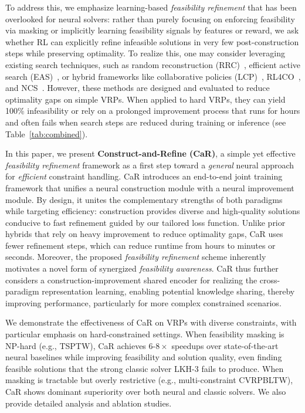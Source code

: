 \documentclass{article} %
\begin{document}
To address this, we emphasize learning-based \emph{feasibility refinement} that has been overlooked for neural solvers: rather than purely focusing on enforcing feasibility via masking or implicitly learning feasibility signals by features or reward, we ask whether RL can explicitly refine infeasible solutions in very few post-construction steps while preserving optimality. To realize this, one may consider leveraging existing search techniques, such as random reconstruction (RRC)~\citep{luo2023neural}, efficient active search (EAS)~\citep{hottung2022efficient}, or hybrid frameworks like collaborative policies (LCP)~\citep{Kim2021LearningCP}, RL4CO~\citep{berto2025rl4co}, and NCS~\citep{kong2024efficient}. However, these methods are designed and evaluated to reduce optimality gaps on simple VRPs. When applied to hard VRPs, they can yield 100\% infeasibility or rely on a prolonged improvement process that runs for hours and often fails when search steps are reduced during training or inference (see Table~\ref{tab:combined}).

In this paper, we present \textbf{Construct-and-Refine (CaR)}, a simple yet effective \emph{feasibility refinement} framework as a first step toward a \emph{general} neural approach for \emph{efficient} constraint handling. 
{CaR introduces an end-to-end joint training framework that unifies a neural construction module with a neural improvement module.} By design, it unites the complementary strengths of both paradigms while targeting efficiency: construction provides diverse {and high-quality} solutions conducive to fast refinement guided by our tailored loss function. Unlike prior hybrids that rely on heavy improvement to reduce optimality gaps, CaR uses fewer refinement steps, which can reduce runtime from hours to minutes or seconds.
Moreover, the proposed \emph{feasibility refinement} scheme inherently motivates a novel form of synergized \emph{feasibility awareness}. CaR thus further considers a construction-improvement shared encoder for realizing the cross-paradigm representation learning, enabling potential knowledge sharing, thereby improving performance, particularly for more complex constrained scenarios.

We demonstrate the effectiveness of CaR on VRPs with diverse constraints, with particular emphasis on hard-constrained settings. When feasibility masking is NP-hard (e.g., TSPTW), CaR achieves $6$-$8\times$ speedups over state-of-the-art neural baselines while improving feasibility and solution quality, even finding feasible solutions that the strong classic solver LKH-3 fails to produce. When masking is tractable but overly restrictive (e.g., multi-constraint CVRPBLTW), CaR shows dominant superiority over both neural and classic solvers. We also provide detailed analysis and ablation studies.
\end{document}
